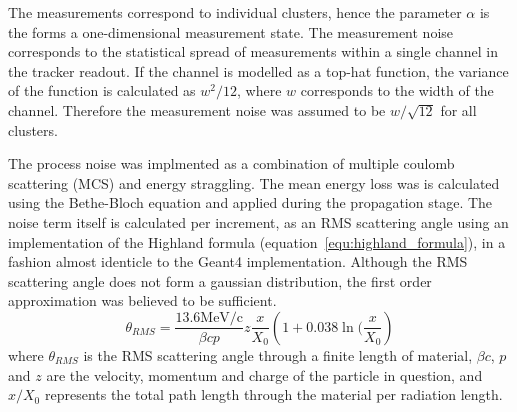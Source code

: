     The measurements correspond to individual clusters, hence the parameter $\alpha$ is the forms a one-dimensional measurement state. The measurement noise corresponds to the statistical spread of measurements within a single channel in the tracker readout. If the channel is modelled as a top-hat function, the variance of the function is calculated as $w^2/12$, where $w$ corresponds to the width of the channel. Therefore the measurement noise was assumed to be $w/\sqrt{12}$ for all clusters.

    The process noise was implmented as a combination of multiple coulomb scattering (MCS) and energy straggling. The mean energy loss was is calculated using the Bethe-Bloch equation and applied during the propagation stage. The noise term itself is calculated per increment, as an RMS scattering angle using an implementation of the Highland formula (equation~\ref{equ:highland_formula}), in a fashion almost identicle to the Geant4 implementation. Although the RMS scattering angle does not form a gaussian distribution, the first order approximation was believed to be sufficient.
    \begin{equation}
      \theta_{RMS} = \frac{13.6\textrm{MeV/c}}{\beta c p} z \frac{x}{X_0}\left( 1 + 0.038 \ln(\frac{x}{X_0} \right)
      \label{equ:highland_formula}
    \end{equation}
    where $\theta_{RMS}$ is the RMS scattering angle through a finite length of material, $\beta c$, $p$ and $z$ are the velocity, momentum and charge of the particle in question, and $x/X_0$ represents the total path length through the material per radiation length.








  
